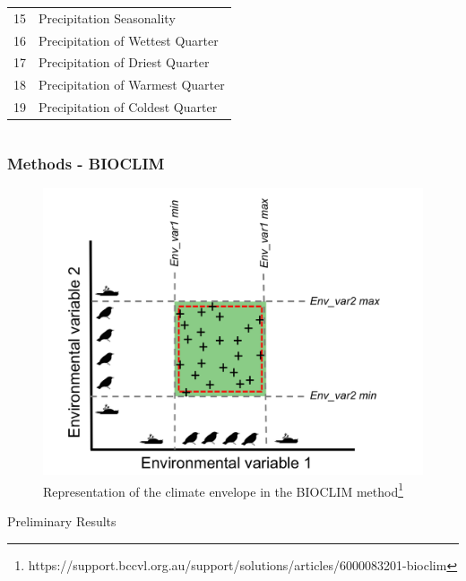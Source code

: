 \documentclass[10pt]{beamer}
\begin{document}
\begin{frame}
\begin{columns}
\begin{column}{0.5\textwidth}
{\begin{table}
\begin{tabular}{c l}
          15       & Precipitation Seasonality              \\
          16       & Precipitation of Wettest Quarter       \\
          17       & Precipitation of Driest Quarter        \\
          18       & Precipitation of Warmest Quarter       \\
          19       & Precipitation of Coldest Quarter       \\
          \hline
        \end{tabular}
      \end{table}
    }
    \end{column}
  \end{columns}
\end{frame}

\begin{frame}
  \frametitle{Methods - BIOCLIM}
  \begin{figure}
    \centering
    \hspace*{-0cm}\includegraphics[scale=0.25]{fig/bioclim_bccvl.png}
    \caption{Representation of the climate envelope in the BIOCLIM method\footnote{\tiny https://support.bccvl.org.au/support/solutions/articles/6000083201-bioclim}}
  \end{figure}
\end{frame}

\begin{frame}
  \vfill
  \centering
  \huge Preliminary Results
  \vfill
\end{frame}
\end{document}
